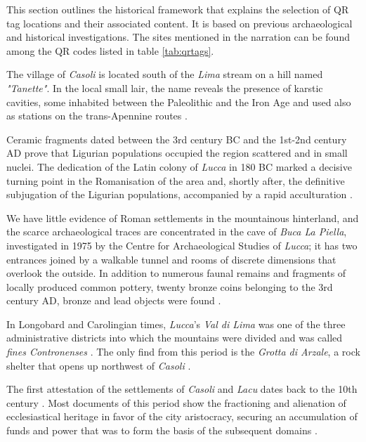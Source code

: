 \documentclass[sustainability,article,submit,pdftex,moreauthors]{Definitions/mdpi}
\begin{document}
This section outlines the historical framework that explains the selection of QR tag locations and their associated content. It is based on previous archaeological and historical investigations. The sites mentioned in the narration can be found among the QR codes listed in table \ref{tab:qrtags}.

The village of \emph{Casoli} is located south of the \emph{Lima} stream on a hill named {\em "Tanette"}. In the local small lair, the name reveals the presence of karstic cavities, some inhabited between the Paleolithic and the Iron Age and used also as stations on the trans-Apennine routes \cite{men76, gia96, pal63, zec72a, zec72b}.

Ceramic fragments dated between the 3rd century BC and the 1st-2nd century AD prove that Ligurian populations occupied the region scattered and in small nuclei. The dedication of the Latin colony of \textit{Lucca} in 180 BC marked a decisive turning point in the Romanisation of the area and, shortly after, the definitive subjugation of the Ligurian populations, accompanied by a rapid acculturation \cite{gia96, cia05}.

We have little evidence of Roman settlements in the mountainous hinterland, and the scarce archaeological traces are concentrated in the cave of \textit{Buca La Piella}, investigated in 1975 by the Centre for Archaeological Studies of \emph{Lucca}; it has two entrances joined by a walkable tunnel and rooms of discrete dimensions that overlook the outside. In addition to numerous faunal remains and fragments of locally produced common pottery, twenty bronze coins belonging to the 3rd century AD, bronze and lead objects were found \cite{gia96, men81, cia03}. 

In Longobard and Carolingian times, \emph{Lucca}'s \emph{Val di Lima} was one of the three administrative districts into which the mountains were divided and was called \emph{fines Contronenses} \cite{qui02, cia06, cia11}. The only find from this period is the \textit{Grotta di Arzale}, a rock shelter that opens up northwest of \emph{Casoli} \cite{gia96}.

The first attestation of the settlements of \emph{Casoli} and \emph{Lacu} dates back to the 10th century \cite{gia96}. Most documents of this period show the fractioning and alienation of ecclesiastical heritage in favor of the city aristocracy, securing an accumulation of funds and power that was to form the basis of the subsequent domains \cite{qui02, gia96, for12, for15}.
\end{document}

